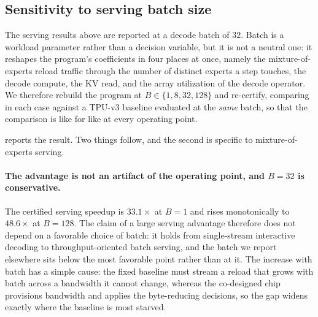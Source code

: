 \subsection{Sensitivity to serving batch size}
\label{sec:batch_sensitivity}

The serving results above are reported at a decode batch of $32$. Batch is a
workload parameter rather than a decision variable, but it is not a neutral one:
it reshapes the program's coefficients in four places at once, namely the
mixture-of-experts reload traffic through the number of distinct experts a step
touches, the decode compute, the KV read, and the array utilization of the
decode operator. We therefore rebuild the program at
$B \in \{1, 8, 32, 128\}$ and re-certify, comparing in each case against a
TPU-v3 baseline evaluated at the \emph{same} batch, so that the comparison is
like for like at every operating point.

 reports the result. Two things follow, and the second is
specific to mixture-of-experts serving.

\paragraph{The advantage is not an artifact of the operating point, and
$B=32$ is conservative.}
The certified serving speedup is $33.1\times$ at $B=1$ and rises monotonically
to $48.6\times$ at $B=128$. The claim of a large serving advantage therefore
does not depend on a favorable choice of batch: it holds from single-stream
interactive decoding to throughput-oriented batch serving, and the batch we
report elsewhere sits below the most favorable point rather than at it. The
increase with batch has a simple cause: the fixed baseline must stream a reload
that grows with batch across a bandwidth it cannot change, whereas the
co-designed chip provisions bandwidth and applies the byte-reducing decisions, so
the gap widens exactly where the baseline is most starved.

